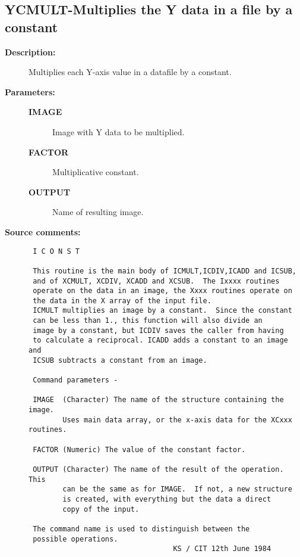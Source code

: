 \subsection{YCMULT-\label{YCMULT}Multiplies the Y data in a file by a constant}
\begin{description}

\item [{\bf Description:}]
 Multiplies each Y-axis value in a datafile by a constant.

\item [{\bf Parameters:}]
\begin{description}
\item [{\bf IMAGE}]
 Image with Y data to be multiplied.
\item [{\bf FACTOR}]
 Multiplicative constant.
\item [{\bf OUTPUT}]
 Name of resulting image.
\end{description}

\item [{\bf Source comments:}]
\begin{verbatim}
 I C O N S T

 This routine is the main body of ICMULT,ICDIV,ICADD and ICSUB,
 and of XCMULT, XCDIV, XCADD and XCSUB.  The Ixxxx routines
 operate on the data in an image, the Xxxx routines operate on
 the data in the X array of the input file.
 ICMULT multiplies an image by a constant.  Since the constant
 can be less than 1., this function will also divide an
 image by a constant, but ICDIV saves the caller from having
 to calculate a reciprocal. ICADD adds a constant to an image and
 ICSUB subtracts a constant from an image.

 Command parameters -

 IMAGE  (Character) The name of the structure containing the image.
        Uses main data array, or the x-axis data for the XCxxx routines.

 FACTOR (Numeric) The value of the constant factor.

 OUTPUT (Character) The name of the result of the operation.  This
        can be the same as for IMAGE.  If not, a new structure
        is created, with everything but the data a direct
        copy of the input.

 The command name is used to distinguish between the
 possible operations.
                                  KS / CIT 12th June 1984
\end{verbatim}
\end{description}
